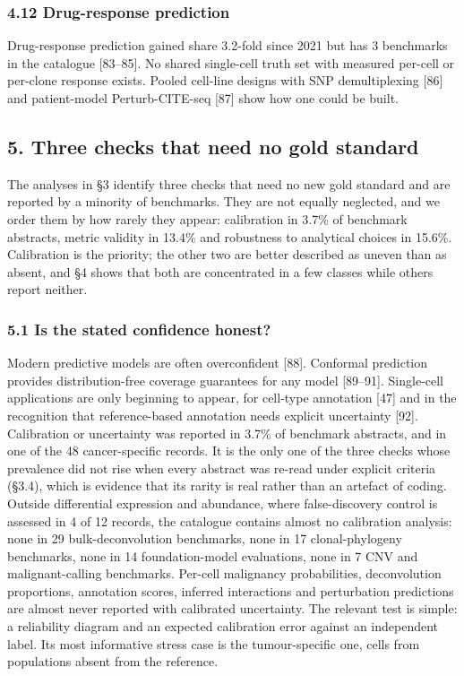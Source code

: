 \documentclass[11pt]{article}
\begin{document}
\subsubsection{4.12 Drug-response
prediction}\label{drug-response-prediction}

Drug-response prediction gained share 3.2-fold since 2021 but has 3
benchmarks in the catalogue {[}83--85{]}. No shared single-cell truth
set with measured per-cell or per-clone response exists. Pooled
cell-line designs with SNP demultiplexing {[}86{]} and patient-model
Perturb-CITE-seq {[}87{]} show how one could be built.

\subsection{5. Three checks that need no gold
standard}\label{three-checks-that-need-no-gold-standard}

The analyses in §3 identify three checks that need no new gold standard
and are reported by a minority of benchmarks. They are not equally
neglected, and we order them by how rarely they appear: calibration in
3.7\% of benchmark abstracts, metric validity in 13.4\% and robustness
to analytical choices in 15.6\%. Calibration is the priority; the other
two are better described as uneven than as absent, and §4 shows that
both are concentrated in a few classes while others report neither.

\subsubsection{5.1 Is the stated confidence
honest?}\label{is-the-stated-confidence-honest}

Modern predictive models are often overconfident {[}88{]}. Conformal
prediction provides distribution-free coverage guarantees for any model
{[}89--91{]}. Single-cell applications are only beginning to appear, for
cell-type annotation {[}47{]} and in the recognition that
reference-based annotation needs explicit uncertainty {[}92{]}.
Calibration or uncertainty was reported in 3.7\% of benchmark abstracts,
and in one of the 48 cancer-specific records. It is the only one of the
three checks whose prevalence did not rise when every abstract was
re-read under explicit criteria (§3.4), which is evidence that its
rarity is real rather than an artefact of coding. Outside differential
expression and abundance, where false-discovery control is assessed in 4
of 12 records, the catalogue contains almost no calibration analysis:
none in 29 bulk-deconvolution benchmarks, none in 17 clonal-phylogeny
benchmarks, none in 14 foundation-model evaluations, none in 7 CNV and
malignant-calling benchmarks. Per-cell malignancy probabilities,
deconvolution proportions, annotation scores, inferred interactions and
perturbation predictions are almost never reported with calibrated
uncertainty. The relevant test is simple: a reliability diagram and an
expected calibration error against an independent label. Its most
informative stress case is the tumour-specific one, cells from
populations absent from the reference.
\end{document}
